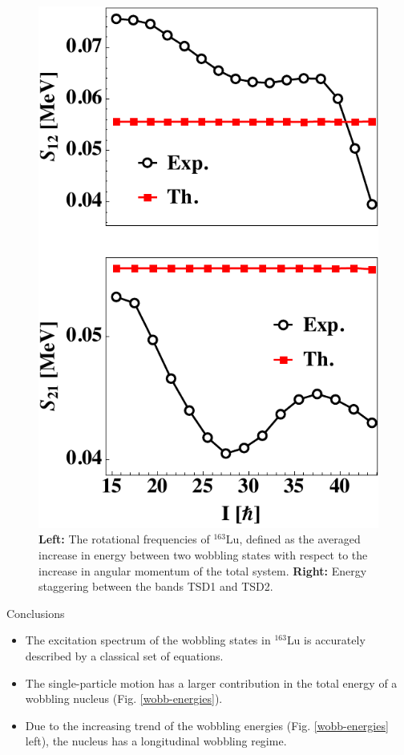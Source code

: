 \documentclass[final]{beamer}
\newlength{\colwidth}
\begin{document}
\begin{frame}[t]
\begin{columns}[t]
\begin{column}{\colwidth}
\begin{figure}
\begin{minipage}{.35\textwidth}
 \includegraphics[scale=1.2]{images/staggers.pdf}
\end{minipage}
    \caption{\textbf{Left:} The rotational frequencies of $^{163}$Lu, defined as the averaged increase in energy between two wobbling states with respect to the increase in angular momentum of the total system. \textbf{Right:} Energy staggering between the bands TSD1 and TSD2.}
    \label{rotational-freqs}
\end{figure}
    \begin{block}{Conclusions}
\begin{itemize}
    \item The excitation spectrum of the wobbling states in $^{163}$Lu is accurately described by a classical set of equations.
    \item The single-particle motion has a larger contribution in the total energy of a wobbling nucleus (Fig. \ref{wobb-energies}).
    \item Due to the increasing trend of the wobbling energies (Fig. \ref{wobb-energies} left), the nucleus has a longitudinal wobbling regime.
\end{itemize}
  \end{block}


\end{column}
\end{columns}
\end{frame}
\end{document}
